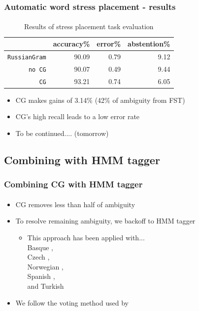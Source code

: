 \documentclass{beamer}
\begin{document}
\begin{frame}
\frametitle{Automatic word stress placement - results}
\framesubtitle{}
\begin{table}
  \centering
  \begin{tabular}{r | r r r }
     & accuracy\% & error\% & abstention\%  \\
    \hline
    \hline
    {\small {\tt RussianGram}} & 90.09 & 0.79 & 9.12 \\
    {\small {\tt no CG}} & 90.07 & 0.49 & 9.44  \\
    {\small {\tt CG}} & 93.21 & 0.74 & 6.05
  \end{tabular}
  \caption{Results of stress placement task evaluation}
  \label{tab:results}
\end{table}
\begin{itemize}
	\item CG makes gains of 3.14\% (42\% of ambiguity from FST)
	\pause
	\item CG's high recall leads to a low error rate
	\pause
	\item To be continued.... (tomorrow)
\end{itemize}
\end{frame}


\subsection{Combining with HMM tagger} %

\begin{frame}
\frametitle{Combining CG with HMM tagger}
\framesubtitle{}
\begin{itemize}
	\item CG removes less than half of ambiguity
	\pause
	\item To resolve remaining ambiguity, we backoff to HMM tagger
	\begin{itemize}
		\item This approach has been applied with...\\
		Basque \cite{ezeiza.ea-98},\\
		Czech \cite{hajic.ea-01,hajic.ea-07},\\
		Norwegian \cite{johannessen.ea-11,johannessen.ea-12},\\
		Spanish \cite{hulden12},\\
		and Turkish \cite{oflazer.tur-96}
		\pause
	\end{itemize}
	\item We follow the voting method used by \cite{hulden12}
\end{itemize}
\end{frame}
\end{document}
